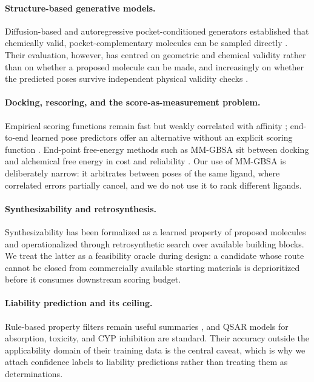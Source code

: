 \documentclass[10pt,twocolumn]{article}
\begin{document}
\paragraph{Structure-based generative models.}
Diffusion-based and autoregressive pocket-conditioned generators established
that chemically valid, pocket-complementary molecules can be sampled directly
\citep{schneuing2024diffsbdd,peng2022pocket2mol,guan2023targetdiff}. Their
evaluation, however, has centred on geometric and chemical validity rather than
on whether a proposed molecule can be made, and increasingly on whether the
predicted poses survive independent physical validity checks
\citep{buttenschoen2024posebusters}.

\paragraph{Docking, rescoring, and the score-as-measurement problem.}
Empirical scoring functions remain fast but weakly correlated with affinity
\citep{trott2010vina}; end-to-end learned pose predictors offer an alternative
without an explicit scoring function \citep{torng2019gnn}. End-point free-energy
methods such as MM-GBSA sit between docking and alchemical free energy in cost
and reliability \citep{genheden2015mmpbsa}. Our use of MM-GBSA is deliberately
narrow: it arbitrates between poses of the same ligand, where correlated errors
partially cancel, and we do not use it to rank different ligands.

\paragraph{Synthesizability and retrosynthesis.}
Synthesizability has been formalized as a learned property of proposed
molecules \citep{gao2020synthesizability} and operationalized through
retrosynthetic search over available building blocks. We treat the latter as a
feasibility oracle during design: a candidate whose route cannot be closed from
commercially available starting materials is deprioritized before it consumes
downstream scoring budget.

\paragraph{Liability prediction and its ceiling.}
Rule-based property filters remain useful summaries
\citep{lipinski1997,baell2010pains,bickerton2012qed}, and QSAR models for
absorption, toxicity, and CYP inhibition are standard. Their accuracy outside
the applicability domain of their training data is the central caveat, which is
why we attach confidence labels to liability predictions rather than treating
them as determinations.
\end{document}
